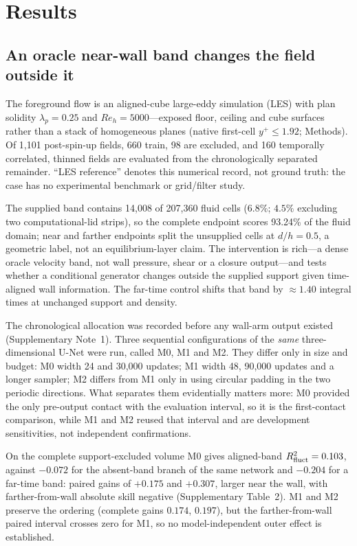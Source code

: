 \section{Results}\label{sec:results}

\subsection{An oracle near-wall band changes the field outside it}\label{sec:cube}\label{sec:first}

The foreground flow is an aligned-cube large-eddy simulation (LES) \cite{coceal2006aligned,coceal2007cubes,xie2006les} with
plan solidity $\lambda_p=0.25$ and $Re_h=5000$---exposed floor, ceiling and cube surfaces rather
than a stack of homogeneous planes (native first-cell $y^+\leq1.92$; Methods). Of 1,101
post-spin-up fields, 660 train, 98 are excluded, and 160 temporally correlated, thinned fields are
evaluated from the chronologically separated remainder. ``LES reference'' denotes this numerical record,
not ground truth: the case has no experimental benchmark or grid/filter study.

The supplied band contains 14,008 of 207,360 fluid cells ($6.8\%$; $4.5\%$ excluding two
computational-lid strips), so the complete endpoint scores 93.24\% of the fluid domain; near and
farther endpoints split the unsupplied cells at $d/h=0.5$, a geometric label, not an
equilibrium-layer claim. The intervention is rich---a dense oracle velocity band, not wall
pressure, shear or a closure output---and tests whether a conditional generator changes outside
the supplied support given time-aligned wall information. The far-time control shifts that
band by $\approx1.40$ integral times at unchanged support and density.

The chronological allocation was recorded before any wall-arm output existed (Supplementary
Note~1). Three sequential configurations of the \emph{same} three-dimensional U-Net were run, called M0, M1 and M2. They differ only in size and budget: M0 width 24 and 30,000
updates; M1 width 48, 90,000 updates and a longer sampler; M2 differs from M1 only in using
circular padding in the two periodic directions. What separates them evidentially matters more:
M0 provided the only pre-output contact with the evaluation interval, so it is the first-contact
comparison, while M1 and M2 reused that interval and are development sensitivities, not
independent confirmations.

On the complete support-excluded volume M0 gives aligned-band $R^2_{\mathrm{fluct}}=0.103$, against
$-0.072$ for the absent-band branch of the same network and $-0.204$ for a far-time band:
paired gains of $+0.175$ and $+0.307$, larger near the wall, with farther-from-wall absolute
skill negative (Supplementary Table~2). M1 and M2 preserve the ordering (complete gains
$0.174$, $0.197$), but the farther-from-wall paired interval crosses zero for M1, so no
model-independent outer effect is established.

